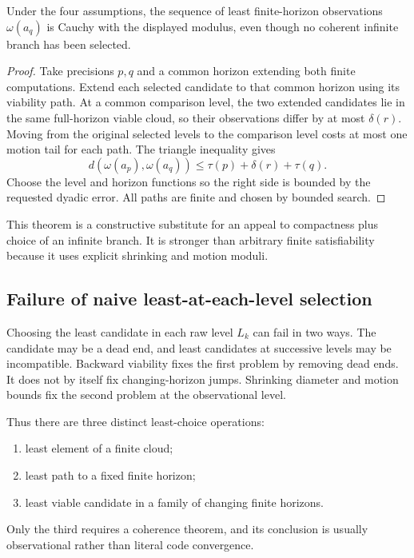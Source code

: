 \begin{theorem}\label{thm:shrinking-coherence}
Under the four assumptions, the sequence of least finite-horizon observations \(\omega(a_q)\) is Cauchy with the displayed modulus, even though no coherent infinite branch has been selected.
\end{theorem}

\begin{proof}
Take precisions \(p,q\) and a common horizon extending both finite computations.  Extend each selected candidate to that common horizon using its viability path.  At a common comparison level, the two extended candidates lie in the same full-horizon viable cloud, so their observations differ by at most \(\delta(r)\).  Moving from the original selected levels to the comparison level costs at most one motion tail for each path.  The triangle inequality gives
\[
 d(\omega(a_p),\omega(a_q))
 \le \tau(p)+\delta(r)+\tau(q).
\]
Choose the level and horizon functions so the right side is bounded by the requested dyadic error.  All paths are finite and chosen by bounded search.
\end{proof}

This theorem is a constructive substitute for an appeal to compactness plus choice of an infinite branch.  It is stronger than arbitrary finite satisfiability because it uses explicit shrinking and motion moduli.

\subsection{Failure of naive least-at-each-level selection}

Choosing the least candidate in each raw level \(L_k\) can fail in two ways.  The candidate may be a dead end, and least candidates at successive levels may be incompatible.  Backward viability fixes the first problem by removing dead ends.  It does not by itself fix changing-horizon jumps.  Shrinking diameter and motion bounds fix the second problem at the observational level.

Thus there are three distinct least-choice operations:
\begin{enumerate}
\item least element of a finite cloud;
\item least path to a fixed finite horizon;
\item least viable candidate in a family of changing finite horizons.
\end{enumerate}
Only the third requires a coherence theorem, and its conclusion is usually observational rather than literal code convergence.


